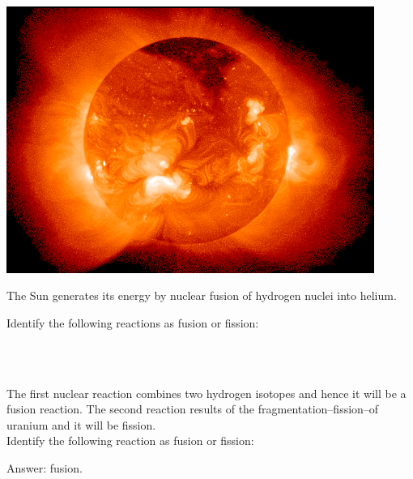 \documentclass[main.tex]{subfiles}
\begin{document}
\begin{description}
\begin{marginfigure}[-11cm]%
      \includegraphics[width=0.9\textwidth]{../Ch-nuclear/figure7}
      \caption{The Sun generates its energy by nuclear fusion of hydrogen nuclei into helium.}
	\end{marginfigure}%

\begin{example} %
Identify the following reactions as fusion or fission:
\begin{center}\\
\end{center}
\\
The first nuclear reaction combines two hydrogen isotopes and hence it will be a fusion reaction. The second reaction results of the fragmentation--fission--of uranium and it will be fission.
\faDiamond\ \\
Identify the following reaction as fusion or fission:
\begin{center}\end{center} 
\flushright Answer: fusion.
\end{example}%
\end{description}




\clearpage\thispagestyle{empty}\mbox{}\clearpage
\end{document}
